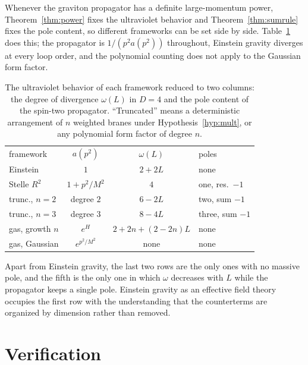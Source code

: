 \documentclass[aps,prd,10pt,twocolumn,superscriptaddress,nofootinbib,floatfix,longbibliography,showpacs,showkeys]{revtex4-2}
\theoremstyle{plain}
\theoremstyle{definition}
\theoremstyle{remark}
\begin{document}
Whenever the graviton propagator has a definite large-momentum power, Theorem~\ref{thm:power} fixes the ultraviolet behavior and Theorem~\ref{thm:sumrule} fixes the pole content, so different frameworks can be set side by side. Table~\ref{tab:compare} does this; the propagator is $1/(p^2a(p^2))$ throughout, Einstein gravity diverges at every loop order, and the polynomial counting does not apply to the Gaussian form factor.

\begin{table}[htbp]
\caption{The ultraviolet behavior of each framework reduced to two columns: the degree of divergence $\omega(L)$ in $D=4$ and the pole content of the spin-two propagator. ``Truncated'' means a deterministic arrangement of $n$ weighted branes under Hypothesis~\ref{hyp:mult}, or any polynomial form factor of degree $n$.}
\label{tab:compare}
\begin{ruledtabular}
\begin{tabular}{lccl}
framework & $a(p^2)$ & $\omega(L)$ & poles \\
\colrule
Einstein & $1$ & $2+2L$ & none \\
Stelle $R^2$ & $1+p^2/M^2$ & $4$ & one, res.\ $-1$ \\
trunc., $n=2$ & degree $2$ & $6-2L$ & two, sum $-1$ \\
trunc., $n=3$ & degree $3$ & $8-4L$ & three, sum $-1$ \\
gas, growth $n$ & $e^{H}$ & $2{+}2n{+}(2{-}2n)L$ & none \\
gas, Gaussian & $e^{p^2/M^2}$ & none & none \\
\end{tabular}
\end{ruledtabular}
\end{table}

Apart from Einstein gravity, the last two rows are the only ones with no massive pole, and the fifth is the only one in which $\omega$ decreases with $L$ while the propagator keeps a single pole. Einstein gravity as an effective field theory \cite{Donoghue1994} occupies the first row with the understanding that the counterterms are organized by dimension rather than removed.

\section{Verification}
\label{sec:verification}
\end{document}
